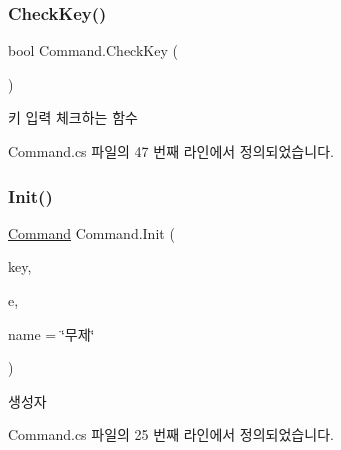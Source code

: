 \subsubsection{\texorpdfstring{CheckKey()}{CheckKey()}}
{\footnotesize\ttfamily bool Command.\+Check\+Key (\begin{DoxyParamCaption}{ }\end{DoxyParamCaption})}



키 입력 체크하는 함수 



Command.\+cs 파일의 47 번째 라인에서 정의되었습니다.


\begin{DoxyCode}{0}

\end{DoxyCode}
\mbox{\label{class_command_afc8d0350d5935d74a3685f427173d62e}} 
\subsubsection{\texorpdfstring{Init()}{Init()}\hspace{0.1cm}{\footnotesize\ttfamily [1/2]}}
{\footnotesize\ttfamily \mbox{\hyperlink{class_command}{Command}} Command.\+Init (\begin{DoxyParamCaption}\item[{Key\+Code}]{key,  }\item[{\mbox{\hyperlink{class_command_acc714b5e0de57b7f24b2619fff860b9d}{Key\+Down\+Event}}}]{e,  }\item[{string}]{name = {\ttfamily \char`\"{}무제\char`\"{}} }\end{DoxyParamCaption})}



생성자 



Command.\+cs 파일의 25 번째 라인에서 정의되었습니다.


